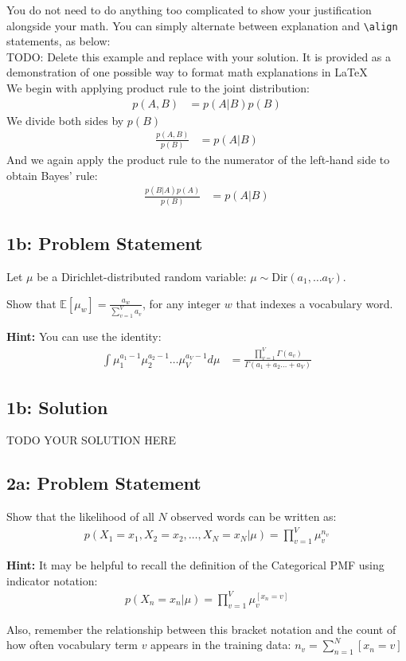 \documentclass[10pt]{article}
\newcommand{\officialdirections}[1]{{\color{purple} #1}}
\begin{document}
You do not need to do anything too complicated to show your justification alongside your math. You can simply alternate between explanation and \texttt{\textbackslash align} statements, as below:
\\

TODO: Delete this example and replace with your solution. It is provided as a demonstration of one possible way to format math explanations in \LaTeX \\
We begin with applying product rule to the joint distribution:
\begin{align*}
    p(A,B) &= p(A|B)p(B)
\end{align*}
We divide both sides by $p(B)$
\begin{align*}
    \frac{p(A,B)}{p(B)} &= p(A|B)
\end{align*}
And we again apply the product rule to the numerator of the left-hand side to obtain Bayes' rule:
\begin{align*}
    \frac{p(B|A)p(A)}{p(B)} &= p(A|B)
\end{align*}

\officialdirections{
\subsection*{1b: Problem Statement}

Let $\mu$ be a Dirichlet-distributed random variable: $\mu \sim \text{Dir}(a_1, \ldots a_V)$. 

Show that $\mathbb{E}[ \mu_w ] = \frac{a_w}{\sum_{v=1}^V a_v}$, for any integer $w$ that indexes a vocabulary word.

\textbf{Hint:} You can use the identity:
\begin{align}
\int \mu_1^{a_1-1} \mu_2^{a_2 - 1} \ldots \mu_V^{a_V-1} d\mu
 &= \frac
 	{\prod_{v=1}^V \Gamma(a_v)}
 	{\Gamma(a_1 + a_2 \ldots + a_V)}
\end{align}
}

\subsection{1b: Solution}
TODO YOUR SOLUTION HERE

\newpage
\officialdirections{
\subsection*{2a: Problem Statement}

Show that the likelihood of all $N$ observed words can be written as:
\begin{align}
p(X_1 = x_1, X_2 = x_2, \ldots, X_N = x_N | \mu) = \prod_{v=1}^V \mu_v^{n_v}
\end{align}

\textbf{Hint:}
It may be helpful to recall the definition of the Categorical PMF using indicator notation:
\begin{align}
p(X_n = x_n | \mu) = \prod_{v=1}^V \mu_v^{[x_n = v]}
\end{align}

Also, remember the relationship between this bracket notation and the count of how often vocabulary term $v$
 appears in the training data:  $n_v =  \sum_{n=1}^N [x_n = v]$
}
\end{document}
